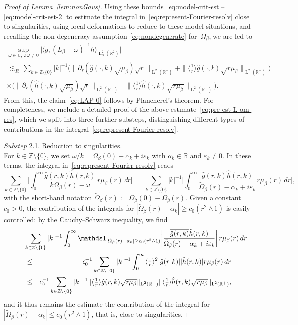 \documentclass[a4paper,11pt,reqno,noindent]{amsart}
\theoremstyle{plain}
\numberwithin{equation}{section}
\newcommand{\e}{\varepsilon}
\newcommand{\R}{\mathbb R}
\newcommand{\Z}{\mathbb Z}
\newcommand{\C}{\mathbb C}
\newcommand{\3}{|\!|\!|}
\newcommand{\Ld}{\operatorname{L}}
\newcommand{\substep}[1]{\noindent \textit{Substep} #1.}
\begin{document}
\begin{proof}[Proof of Lemma~\ref{lem:nonGaus}]
\medskip\noindent
{Using these bounds~\eqref{eq:model-crit-est}--\eqref{eq:model-crit-est-2} to estimate the integral in~\eqref{eq:represent-Fourier-resolv} close to singularities, using local deformations to reduce to these model situations, and recalling the non-degeneracy assumption~\eqref{eq:nondegenerate} for~$\Omega_\beta$, we are led to
\begin{multline}\label{eq:pre-est-L-om-res}
\sup_{\omega\in\C,\,\Im\omega\ne0}\big|\big\langle g,(L_\beta-\omega)^{-1}h\big\rangle_{\Ld^2_\beta(\R^2)}\big|\\
\,\lesssim_{R}\,\sum_{k\in\Z\setminus\{0\}}|k|^{-1}
\Big(\|\partial_r(\hat g(\cdot,k)\sqrt{\mu_\beta})\sqrt{r}\|_{\Ld^2(\R^+)}
+\| \langle\tfrac1r\rangle\hat g(\cdot,k)\sqrt{r\mu_\beta}\|_{\Ld^2(\R^+)}\Big)\\
\times\Big(\|\partial_r(\hat h(\cdot,k)\sqrt{\mu_\beta})\sqrt{r}\|_{\Ld^2(\R^+)}
+\| \langle\tfrac1r\rangle\hat h(\cdot,k)\sqrt{r\mu_\beta}\|_{\Ld^2(\R^+)}\Big).
\end{multline}
From this, the claim~\eqref{eq:LAP-0} follows by Plancherel's theorem.
For completeness, we include a detailed proof of the above estimate~\eqref{eq:pre-est-L-om-res}, which we split into three further substeps, distinguishing different types of contributions in the integral~\eqref{eq:represent-Fourier-resolv}.

\medskip
\substep{2.1} Reduction to singularities.\\
For $k\in\Z\setminus\{0\}$, we set $\omega/k=\Omega_\beta(0)-\alpha_k+i\e_k$ with $\alpha_k\in\R$ and $\e_k\ne0$.
In these terms, the integral in~\eqref{eq:represent-Fourier-resolv} reads
\begin{equation*}
\sum_{k\in\Z\setminus\{0\}}\bigg|\int_0^\infty\frac{\overline{\hat g(r,k)}\hat h(r,k)}{k\Omega_\beta(r)-\omega}\,r\mu_\beta(r)\,dr\bigg|
\,=\,\sum_{k\in\Z\setminus\{0\}}|k|^{-1}\bigg|\int_0^\infty\frac{\overline{\hat g(r,k)}\hat h(r,k)}{\tilde\Omega_\beta(r)-\alpha_k+i\e_k}\,r\mu_\beta(r)\,dr\bigg|,
\end{equation*}
with the short-hand notation $\tilde\Omega_\beta(r):=\Omega_\beta(0)-\Omega_\beta(r)$.
Given a constant $c_0>0$, the contribution of the integrals for $|\tilde\Omega_\beta(r)-\alpha_k|\ge c_0(r^2\wedge 1)$ is easily controlled: by the Cauchy--Schwarz inequality, we find
\begin{eqnarray*}
\lefteqn{\sum_{k\in\Z\setminus\{0\}}|k|^{-1}\int_0^\infty\mathds1_{|\tilde\Omega_\beta(r)-\alpha_k|\ge c_0(r^2\wedge 1)}\bigg|\frac{\overline{\hat g(r,k)}\hat h(r,k)}{\tilde\Omega_\beta(r)-\alpha_k+i\e_k}\bigg|\,r\mu_\beta(r)\,dr}\\
&\le&c_0^{-1}\sum_{k\in\Z\setminus\{0\}}|k|^{-1}\int_0^\infty\langle\tfrac1r\rangle^2|\hat g(r,k)||\hat h(r,k)|r\mu_\beta(r)\,dr\\
&\le&c_0^{-1}\sum_{k\in\Z\setminus\{0\}}|k|^{-1}\|\langle\tfrac1r\rangle\hat g(r,k)\sqrt{r\mu_\beta}\|_{\Ld^2(\R^+)}\|\langle\tfrac1r\rangle\hat h(r,k)\sqrt{r\mu_\beta}\|_{\Ld^2(\R^+)},
\end{eqnarray*}
and it thus remains the estimate the contribution of the integral for $|\tilde\Omega_\beta(r)-\alpha_k|\le c_0(r^2\wedge1)$, that is, close to singularities.

}
\end{proof}
\end{document}
